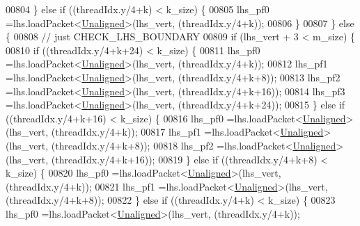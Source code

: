 \begin{DoxyCode}
00804       \} \textcolor{keywordflow}{else} \textcolor{keywordflow}{if} ((threadIdx.y/4+k) < k\_size) \{
00805         lhs\_pf0 =lhs.loadPacket<\hyperlink{group__enums_gga45fe06e29902b7a2773de05ba27b47a1ac935220b4c844108e183ebe30a4d5204}{Unaligned}>(lhs\_vert, (threadIdx.y/4+k));
00806       \}
00807     \} \textcolor{keywordflow}{else} \{
00808       \textcolor{comment}{// just CHECK\_LHS\_BOUNDARY}
00809       \textcolor{keywordflow}{if} (lhs\_vert + 3 < m\_size) \{
00810         \textcolor{keywordflow}{if} ((threadIdx.y/4+k+24) < k\_size) \{
00811           lhs\_pf0 =lhs.loadPacket<\hyperlink{group__enums_gga45fe06e29902b7a2773de05ba27b47a1ac935220b4c844108e183ebe30a4d5204}{Unaligned}>(lhs\_vert, (threadIdx.y/4+k));
00812           lhs\_pf1 =lhs.loadPacket<\hyperlink{group__enums_gga45fe06e29902b7a2773de05ba27b47a1ac935220b4c844108e183ebe30a4d5204}{Unaligned}>(lhs\_vert, (threadIdx.y/4+k+8));
00813           lhs\_pf2 =lhs.loadPacket<\hyperlink{group__enums_gga45fe06e29902b7a2773de05ba27b47a1ac935220b4c844108e183ebe30a4d5204}{Unaligned}>(lhs\_vert, (threadIdx.y/4+k+16));
00814           lhs\_pf3 =lhs.loadPacket<\hyperlink{group__enums_gga45fe06e29902b7a2773de05ba27b47a1ac935220b4c844108e183ebe30a4d5204}{Unaligned}>(lhs\_vert, (threadIdx.y/4+k+24));
00815         \} \textcolor{keywordflow}{else} \textcolor{keywordflow}{if} ((threadIdx.y/4+k+16) < k\_size) \{
00816           lhs\_pf0 =lhs.loadPacket<\hyperlink{group__enums_gga45fe06e29902b7a2773de05ba27b47a1ac935220b4c844108e183ebe30a4d5204}{Unaligned}>(lhs\_vert, (threadIdx.y/4+k));
00817           lhs\_pf1 =lhs.loadPacket<\hyperlink{group__enums_gga45fe06e29902b7a2773de05ba27b47a1ac935220b4c844108e183ebe30a4d5204}{Unaligned}>(lhs\_vert, (threadIdx.y/4+k+8));
00818           lhs\_pf2 =lhs.loadPacket<\hyperlink{group__enums_gga45fe06e29902b7a2773de05ba27b47a1ac935220b4c844108e183ebe30a4d5204}{Unaligned}>(lhs\_vert, (threadIdx.y/4+k+16));
00819         \} \textcolor{keywordflow}{else} \textcolor{keywordflow}{if} ((threadIdx.y/4+k+8) < k\_size) \{
00820           lhs\_pf0 =lhs.loadPacket<\hyperlink{group__enums_gga45fe06e29902b7a2773de05ba27b47a1ac935220b4c844108e183ebe30a4d5204}{Unaligned}>(lhs\_vert, (threadIdx.y/4+k));
00821           lhs\_pf1 =lhs.loadPacket<\hyperlink{group__enums_gga45fe06e29902b7a2773de05ba27b47a1ac935220b4c844108e183ebe30a4d5204}{Unaligned}>(lhs\_vert, (threadIdx.y/4+k+8));
00822         \} \textcolor{keywordflow}{else} \textcolor{keywordflow}{if} ((threadIdx.y/4+k) < k\_size) \{
00823           lhs\_pf0 =lhs.loadPacket<\hyperlink{group__enums_gga45fe06e29902b7a2773de05ba27b47a1ac935220b4c844108e183ebe30a4d5204}{Unaligned}>(lhs\_vert, (threadIdx.y/4+k));

\end{DoxyCode}
